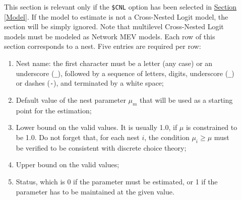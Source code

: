 \documentclass[12pt]{memoir}
\begin{document}
\begin{description}
   \item[]  This section is relevant only if the
      \verb+$CNL+ option has been selected in \hyperlink{Model}{Section [Model]}. If the model to estimate is not a Cross-Nested Logit model, the section will be
      simply ignored.  Note that multilevel Cross-Nested Logit models must be modeled as Network MEV models.
      Each row of this section corresponds to a nest. Five entries are required per row:
      \begin{enumerate}
         \item Nest name:   the first character must be a letter (any case) or an underscore
            (\verb+_+), followed by a sequence of letters, digits, underscore (\verb+_+)
            or dashes (\verb+-+), and terminated by a white space;
         \item Default value of the nest parameter $\mu_m$ that will be used as a starting point for the estimation;
         \item Lower bound on the valid values. It is usually 1.0, if $\mu$ is
            constrained to be 1.0. Do not forget that, for each nest $i$, the condition
            $\mu_i \geq \mu$ must be verified to be consistent with discrete choice
            theory;
         \item Upper bound on the valid values;
         \item Status, which is 0 if the parameter must be estimated, or 1 if the parameter has to be maintained at the given value. 
      \end{enumerate}


\end{description}
\end{document}
